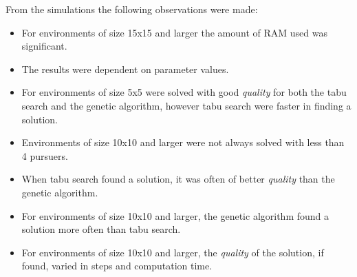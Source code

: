 \newpage From the simulations the following observations were made:
\begin{itemize}
\item{For environments of size 15x15 and larger the amount of RAM used was significant.}
\item{The results were dependent on parameter values.}
\item{For environments of size 5x5 were solved with good \emph{quality} for both the tabu search and the genetic algorithm, however tabu search were faster in finding a solution.}
\item{Environments of size 10x10 and larger were not always solved with less than 4 pursuers.}
\item{When tabu search found a solution, it was often of better \emph{quality} than the genetic algorithm.}
\item{For environments of size 10x10 and larger, the genetic algorithm found a solution more often than tabu search.}
\item{For environments of size 10x10 and larger, the \emph{quality} of the solution, if found, varied in steps and computation time.}
\end{itemize}
